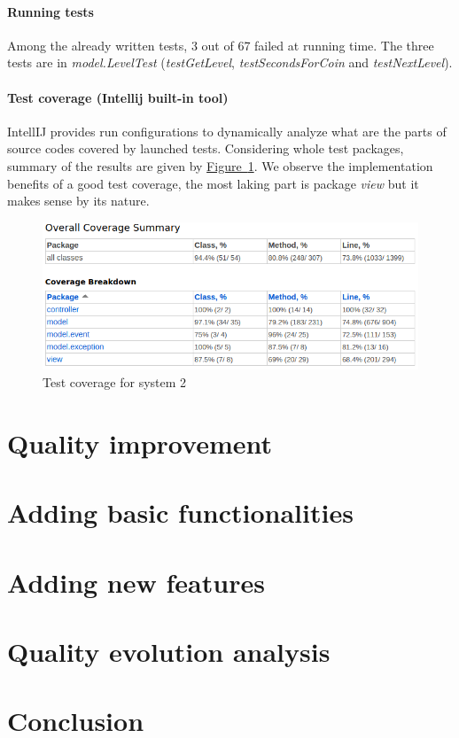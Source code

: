 \documentclass[]{article}
\newcommand{\wordlink}[2]{\hyperref[#2]{#1~\ref{#2}}}
\begin{document}
\paragraph{Running tests}

Among the already written tests, 3 out of 67 failed at running time. The three tests are in \textit{model.LevelTest} (\textit{testGetLevel}, \textit{testSecondsForCoin} and \textit{testNextLevel}). 

\paragraph{Test coverage (Intellij built-in tool)}

IntellIJ provides run configurations to dynamically analyze what are the parts of source codes covered by launched tests. Considering whole test packages, summary of the results are given by \wordlink{Figure}{fig:S2_test_coverage}. We observe the implementation benefits of a good test coverage, the most laking part is package \textit{view} but it makes sense by its nature.

\newpage

\begin{figure}[h]
\centering
\includegraphics[width=0.75\linewidth]{S2-test_coverage}
\caption{Test coverage for system 2}
\label{fig:S2_test_coverage}
\end{figure}

\newpage
\section{Quality improvement}
\newpage
\section{Adding basic functionalities}
\newpage
\section{Adding new features}
\newpage
\section{Quality evolution analysis}
\newpage
\section{Conclusion}
\end{document}
